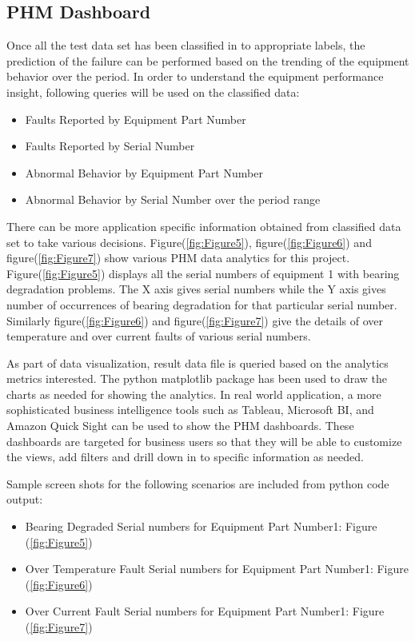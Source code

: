 \documentclass[sigconf]{acmart}
\begin{document}
\subsection{PHM Dashboard}
Once all the test data set has been classified in to appropriate labels, the prediction of the failure can be performed based on the trending of the equipment behavior over the period. In order to understand the equipment performance insight, following queries will be used on the classified data:
\begin{itemize}
  \item Faults Reported by Equipment Part Number
  \item Faults Reported by Serial Number
  \item Abnormal Behavior by Equipment Part Number
  \item Abnormal Behavior by Serial Number over the period range
\end{itemize}
There can be more application specific information obtained from classified data set to take various decisions. Figure(\ref{fig:Figure5}), figure(\ref{fig:Figure6}) and figure(\ref{fig:Figure7}) show various PHM data analytics for this project. Figure(\ref{fig:Figure5}) displays all the serial numbers of equipment 1 with bearing degradation problems. The X axis gives serial numbers while the Y axis gives number of occurrences of bearing degradation for that particular serial number. Similarly figure(\ref{fig:Figure6}) and figure(\ref{fig:Figure7}) give the details of over temperature and over current faults of various serial numbers.

As part of data visualization, result data file is queried based on the analytics metrics interested. The python matplotlib package has been used to draw the charts as needed for showing the analytics. In real world application, a more sophisticated business intelligence tools such as Tableau, Microsoft BI, and Amazon Quick Sight can be used to show the PHM dashboards. These dashboards are targeted for business users so that they will be able to customize the views, add filters and drill down in to specific information as needed. 

Sample screen shots for the following scenarios are included from python code output:

\begin{itemize}
  \item Bearing Degraded Serial numbers for Equipment Part Number1: Figure (\ref{fig:Figure5})
  \item Over Temperature Fault Serial numbers for Equipment Part Number1: Figure (\ref{fig:Figure6})
  \item Over Current Fault Serial numbers for Equipment Part Number1: Figure (\ref{fig:Figure7})
\end{itemize}
\end{document}
